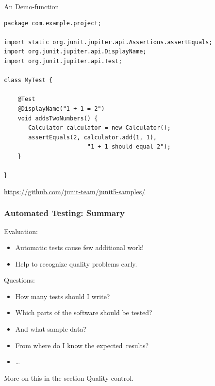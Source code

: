 \begin{frame}[containsverbatim]{An Demo-function}
\footnotesize
\lstset{language=Java}
\begin{lstlisting}[frame=single]
package com.example.project;

import static org.junit.jupiter.api.Assertions.assertEquals;
import org.junit.jupiter.api.DisplayName;
import org.junit.jupiter.api.Test;

class MyTest {

	@Test
	@DisplayName("1 + 1 = 2")
	void addsTwoNumbers() {
	   Calculator calculator = new Calculator();
	   assertEquals(2, calculator.add(1, 1),
		                "1 + 1 should equal 2");
	}

}
\end{lstlisting}

\begin{flushright}
\tiny
\url{https://github.com/junit-team/junit5-samples/}
\end{flushright}
\end{frame}


\begin{frame}
 \frametitle{Automated Testing: Summary}
 
 Evaluation:
 \begin{itemize} 
  \item Automatic tests cause few additional work!
  \item Help to recognize quality problems early.
\end{itemize}
 
\pause
 
Questions:
\begin{itemize}
   \item How many tests should I write?
   \item Which parts of the software should be tested?
   \item And what sample data?
   \item From where do I know the  \glqq expected\grqq\ results?
   \item \dots
\end{itemize}

\pause
 
More on this in the section \glqq Quality control\grqq.
\end{frame}

